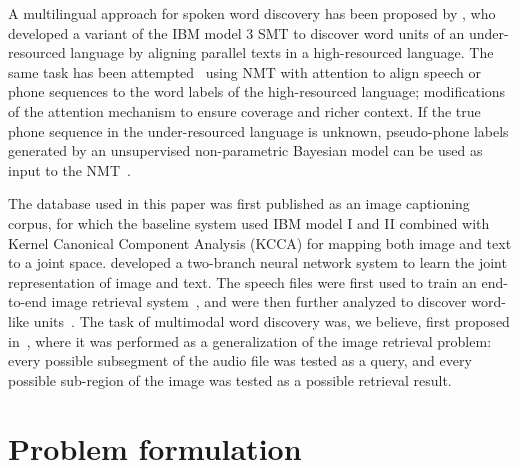 \documentclass[a4paper]{article}
\begin{document}
A multilingual approach for spoken word discovery has been proposed by \cite{Stahlberg12}, who developed a variant of the IBM model 3 SMT to discover word units of an under-resourced language
by aligning parallel texts in
a high-resourced language.
The same task has been attempted~\cite{Duong16} using NMT with attention \cite{Bahdanau14} to align speech or phone sequences to the word labels of the high-resourced language; modifications of the attention mechanism to ensure coverage and richer context.
If the true phone sequence in the under-resourced language is unknown,  pseudo-phone labels generated by an unsupervised non-parametric Bayesian model \cite{Ondel2018} can be used as input to the NMT~\cite{Godard2018}.
 
The database used in this paper was first published as an image captioning corpus, for which the baseline system
\cite{Hodosh2010} used IBM model I and II \cite{Brown93} combined with Kernel Canonical Component Analysis (KCCA) for mapping both image and text to a joint space. \cite{Karpathy14, Karpathy15} developed a two-branch neural network system to learn the joint representation of image and text.
The speech files were first used to train an end-to-end image retrieval system~\cite{Harwath15,Harwath16-ULO}, and were then further analyzed to discover word-like units~\cite{Harwath17}.
The task of multimodal word discovery was, we believe, first proposed in~\cite{Harwath17}, where it was performed as a generalization of the image retrieval problem: every possible subsegment of the audio file was tested as a query, and every possible sub-region of the image was tested as a possible retrieval result.

\section{Problem formulation}
\end{document}
